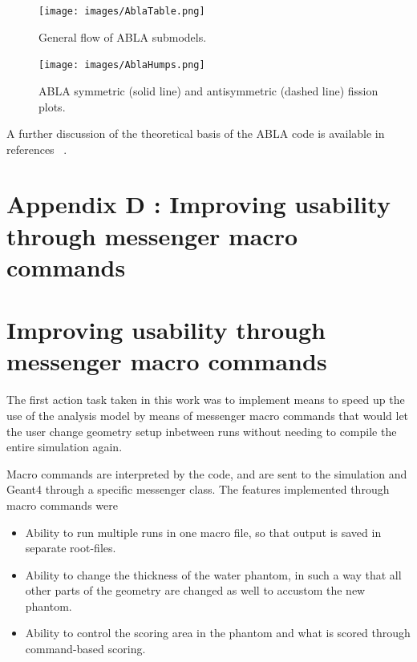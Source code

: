 
\begin{figure}[h] 
\begin{center}
\texttt{[image: images/AblaTable.png]}  
\caption{\label{fig:ablatable} General flow of ABLA submodels.}
 
 \end{center}
 \end{figure}
\begin{figure}[h] 
\begin{center}
\texttt{[image: images/AblaHumps.png]}  
\caption{\label{fig:ablahumps} ABLA symmetric (solid line) and antisymmetric (dashed line) fission plots.}
 
 \end{center}
 \end{figure}

A further discussion of the theoretical basis of the ABLA code is available in references ~\cite{ablatalk,iia}.

\clearpage

\section*{Appendix D \label{AppendixD}: Improving usability through messenger macro commands}

\renewcommand{\theequation}{D\arabic{equation}}
\setcounter{equation}{0}  
\renewcommand{\thefigure}{D\arabic{figure}}
\setcounter{figure}{0}
\renewcommand{\thetable}{D\arabic{table}}
\setcounter{table}{0}
\renewcommand{\thesection}{D}
\setcounter{section}{1}
\section*{Improving usability through messenger macro commands \label{logofwork}}

The first action task taken in this work was to implement means to speed up the use of the analysis model by means of messenger macro commands that would let the user change geometry setup inbetween runs without needing to compile the entire simulation again.

Macro commands are interpreted by the code, and are sent to the simulation and Geant4 through a specific messenger class. The features implemented through macro commands were
\begin{itemize}
 \item Ability to run multiple runs in one macro file, so that output is saved in separate root-files.
\item Ability to change the thickness of the water phantom, in such a way that all other parts of the geometry are changed as well to accustom the new phantom.
\item Ability to control the scoring area in the phantom and what is scored through command-based scoring.
\end{itemize}


